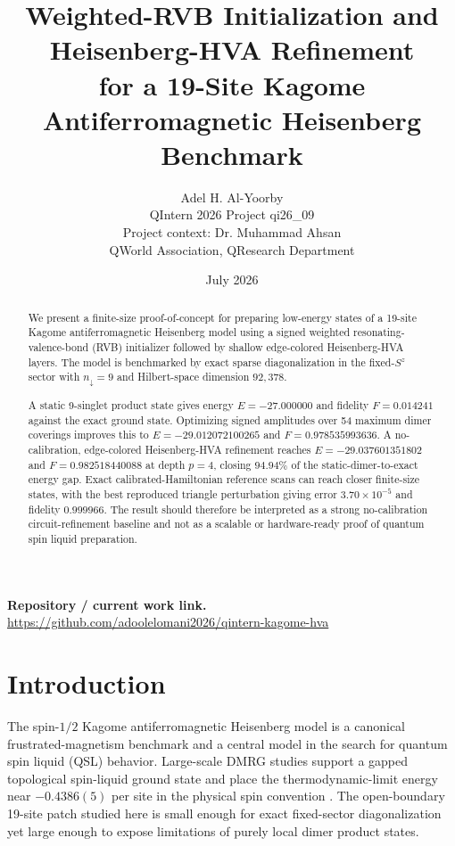 \documentclass[11pt]{article}
\title{\textbf{Weighted-RVB Initialization and Heisenberg-HVA Refinement\\
for a 19-Site Kagome Antiferromagnetic Heisenberg Benchmark}}
\author{Adel H. Al-Yoorby\\
QIntern 2026 Project qi26\_09\\
Project context: Dr. Muhammad Ahsan\\
QWorld Association, QResearch Department}
\date{July 2026}
\newcommand{\hvaE}{-29.037601351802}
\newcommand{\hvaF}{0.982518440088}
\newcommand{\rvbE}{-29.012072100265}
\newcommand{\rvbF}{0.978535993636}
\begin{document}
\maketitle

\begin{abstract}
We present a finite-size proof-of-concept for preparing low-energy states of a 19-site Kagome antiferromagnetic Heisenberg model using a signed weighted resonating-valence-bond (RVB) initializer followed by shallow edge-colored Heisenberg-HVA layers.  The model is benchmarked by exact sparse diagonalization in the fixed-$S^z$ sector with $n_\downarrow=9$ and Hilbert-space dimension $92{,}378$.

A static 9-singlet product state gives energy $E=-27.000000$ and fidelity $F=0.014241$ against the exact ground state.  Optimizing signed amplitudes over 54 maximum dimer coverings improves this to $E=\rvbE$ and $F=\rvbF$.  A no-calibration, edge-colored Heisenberg-HVA refinement reaches $E=\hvaE$ and $F=\hvaF$ at depth $p=4$, closing $94.94\%$ of the static-dimer-to-exact energy gap.  Exact calibrated-Hamiltonian reference scans can reach closer finite-size states, with the best reproduced triangle perturbation giving error $3.70\times 10^{-5}$ and fidelity $0.999966$.  The result should therefore be interpreted as a strong no-calibration circuit-refinement baseline and not as a scalable or hardware-ready proof of quantum spin liquid preparation.
\end{abstract}

\textbf{Repository / current work link.}\\
\href{https://github.com/adoolelomani2026/qintern-kagome-hva}{https://github.com/adoolelomani2026/qintern-kagome-hva}

\section{Introduction}

The spin-$1/2$ Kagome antiferromagnetic Heisenberg model is a canonical frustrated-magnetism benchmark and a central model in the search for quantum spin liquid (QSL) behavior.  Large-scale DMRG studies support a gapped topological spin-liquid ground state and place the thermodynamic-limit energy near $-0.4386(5)$ per site in the physical spin convention \cite{yan2011,depenbrock2012}.  The open-boundary 19-site patch studied here is small enough for exact fixed-sector diagonalization yet large enough to expose limitations of purely local dimer product states.
\end{document}

